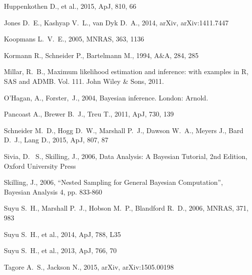 \documentclass[useAMS,usenatbib]{mn2e}
\begin{document}
\begin{thebibliography}{99}
 Huppenkothen D., et al., 2015, ApJ, 810, 
66 


 Jones D.~E., Kashyap V.~L., van Dyk D.~A., 2014, arXiv, arXiv:1411.7447

Koopmans L.~V.~E., 2005, MNRAS, 363, 1136

 Kormann R., Schneider P., Bartelmann M., 1994, A\&A, 284, 285

Millar, R.~B., Maximum likelihood estimation and inference: with examples in R, SAS and ADMB. Vol. 111. John Wiley \& Sons, 2011.

O'Hagan, A., Forster,~J., 2004, Bayesian inference. London: Arnold.

 Pancoast A., Brewer B.~J., Treu T., 2011, ApJ, 730, 139

 Schneider M.~D., Hogg D.~W., Marshall 
P.~J., Dawson W.~A., Meyers J., Bard D.~J., Lang D., 2015, ApJ, 807, 87

 Sivia, 
D.~ S., Skilling, J., 2006, Data Analysis: A Bayesian Tutorial, 2nd 
Edition, Oxford University Press

 Skilling, 
J., 2006, ``Nested Sampling for General Bayesian Computation'', Bayesian 
Analysis 4, pp. 833-860

Suyu S.~H., Marshall P.~J., Hobson M.~P., Blandford R.~D., 2006, MNRAS, 
371, 983

Suyu S.~H., et al., 2014, ApJ, 788, L35 

Suyu S.~H., et al., 2013, ApJ, 766, 70 

 Tagore A.~S., Jackson N., 2015, arXiv, arXiv:1505.00198


\end{thebibliography}
\end{document}
